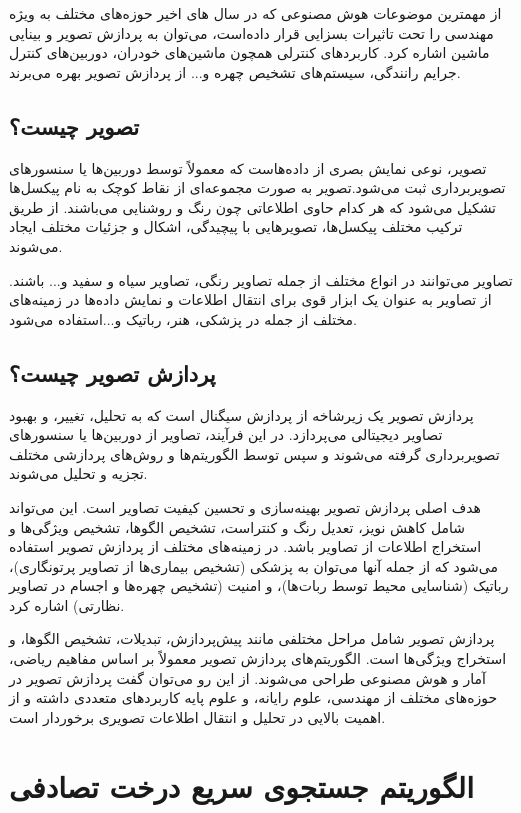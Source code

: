 از مهمترین موضوعات هوش مصنوعی که در سال های اخیر حوزه‌های مختلف به ویژه مهندسی را تحت تاثیرات بسزایی قرار داده‌است، می‌توان به پردازش تصویر و بینایی ماشین اشاره کرد. کاربردهای کنترلی همچون ماشین‌های خودران، دوربین‌های کنترل جرایم رانندگی، سیستم‌های تشخیص چهره و... از پردازش تصویر بهره می‌برند.
\subsection{تصویر چیست؟}

تصویر، نوعی نمایش بصری از داده‌هاست که معمولاً توسط دوربین‌ها یا سنسورهای تصویربرداری ثبت می‌شود.تصویر به صورت مجموعه‌ای از نقاط کوچک به نام پیکسل‌ها تشکیل می‌شود که هر کدام حاوی اطلاعاتی چون رنگ و روشنایی می‌باشند. از طریق ترکیب مختلف پیکسل‌ها، تصویرهایی با پیچیدگی، اشکال و جزئیات مختلف ایجاد می‌شوند.

تصاویر می‌توانند در انواع مختلف از جمله تصاویر رنگی، تصاویر سیاه و سفید و... باشند. از تصاویر به عنوان یک ابزار قوی برای انتقال اطلاعات و نمایش داده‌ها در زمینه‌های مختلف از جمله در پزشکی، هنر، رباتیک و...استفاده می‌شود.
\subsection{پردازش تصویر چیست؟}

پردازش تصویر یک زیرشاخه از پردازش سیگنال است که به تحلیل، تغییر، و بهبود تصاویر دیجیتالی می‌پردازد. در این فرآیند، تصاویر از دوربین‌ها یا سنسورهای تصویربرداری گرفته می‌شوند و سپس توسط الگوریتم‌ها و روش‌های پردازشی مختلف تجزیه و تحلیل می‌شوند.

هدف اصلی پردازش تصویر بهینه‌سازی و تحسین کیفیت تصاویر است. این می‌تواند شامل کاهش نویز، تعدیل رنگ و کنتراست، تشخیص الگوها، تشخیص ویژگی‌ها و استخراج اطلاعات از تصاویر باشد. در زمینه‌های مختلف از پردازش تصویر استفاده می‌شود که از جمله آنها می‌توان به پزشکی (تشخیص بیماری‌ها از تصاویر پرتونگاری)، رباتیک (شناسایی محیط توسط ربات‌ها)، و امنیت (تشخیص چهره‌ها و اجسام در تصاویر نظارتی) اشاره کرد.

پردازش تصویر شامل مراحل مختلفی مانند پیش‌پردازش، تبدیلات، تشخیص الگوها، و استخراج ویژگی‌ها است. الگوریتم‌های پردازش تصویر معمولاً بر اساس مفاهیم ریاضی، آمار و هوش مصنوعی طراحی می‌شوند. از این رو می‌توان گفت پردازش تصویر در حوزه‌های مختلف از مهندسی، علوم رایانه، و علوم پایه کاربردهای متعددی داشته و از اهمیت بالایی در تحلیل و انتقال اطلاعات تصویری برخوردار است.

\section{الگوریتم جستجوی سریع درخت تصادفی}
